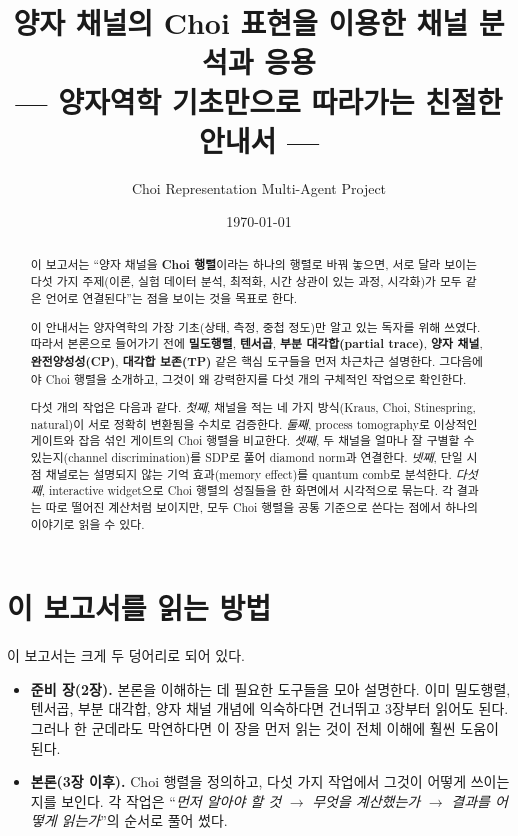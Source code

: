 \documentclass[11pt,a4paper]{article}
\title{\textbf{양자 채널의 Choi 표현을 이용한 채널 분석과 응용\\[4pt]\large{--- 양자역학 기초만으로 따라가는 친절한 안내서 ---}}}
\author{Choi Representation Multi-Agent Project}
\date{\today}
\begin{document}
\maketitle

\begin{abstract}
이 보고서는 ``양자 채널을 \textbf{Choi 행렬}이라는 하나의 행렬로 바꿔 놓으면, 서로 달라 보이는 다섯 가지 주제(이론, 실험 데이터 분석, 최적화, 시간 상관이 있는 과정, 시각화)가 모두 같은 언어로 연결된다''는 점을 보이는 것을 목표로 한다.

이 안내서는 양자역학의 가장 기초(상태, 측정, 중첩 정도)만 알고 있는 독자를 위해 쓰였다. 따라서 본론으로 들어가기 전에 \textbf{밀도행렬}, \textbf{텐서곱}, \textbf{부분 대각합(partial trace)}, \textbf{양자 채널}, \textbf{완전양성성(CP)}, \textbf{대각합 보존(TP)} 같은 핵심 도구들을 먼저 차근차근 설명한다. 그다음에야 Choi 행렬을 소개하고, 그것이 왜 강력한지를 다섯 개의 구체적인 작업으로 확인한다.

다섯 개의 작업은 다음과 같다. \emph{첫째}, 채널을 적는 네 가지 방식(Kraus, Choi, Stinespring, natural)이 서로 정확히 변환됨을 수치로 검증한다. \emph{둘째}, process tomography로 이상적인 게이트와 잡음 섞인 게이트의 Choi 행렬을 비교한다. \emph{셋째}, 두 채널을 얼마나 잘 구별할 수 있는지(channel discrimination)를 SDP로 풀어 diamond norm과 연결한다. \emph{넷째}, 단일 시점 채널로는 설명되지 않는 기억 효과(memory effect)를 quantum comb로 분석한다. \emph{다섯째}, interactive widget으로 Choi 행렬의 성질들을 한 화면에서 시각적으로 묶는다. 각 결과는 따로 떨어진 계산처럼 보이지만, 모두 Choi 행렬을 공통 기준으로 쓴다는 점에서 하나의 이야기로 읽을 수 있다.
\end{abstract}

\tableofcontents
\newpage

\section{이 보고서를 읽는 방법}

이 보고서는 크게 두 덩어리로 되어 있다.

\begin{itemize}
  \item \textbf{준비 장(2장).} 본론을 이해하는 데 필요한 도구들을 모아 설명한다. 이미 밀도행렬, 텐서곱, 부분 대각합, 양자 채널 개념에 익숙하다면 건너뛰고 3장부터 읽어도 된다. 그러나 한 군데라도 막연하다면 이 장을 먼저 읽는 것이 전체 이해에 훨씬 도움이 된다.
  \item \textbf{본론(3장 이후).} Choi 행렬을 정의하고, 다섯 가지 작업에서 그것이 어떻게 쓰이는지를 보인다. 각 작업은 ``\emph{먼저 알아야 할 것} $\to$ \emph{무엇을 계산했는가} $\to$ \emph{결과를 어떻게 읽는가}''의 순서로 풀어 썼다.
\end{itemize}
\end{document}
